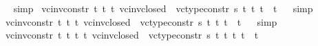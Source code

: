 \begin{isabellebody}
\isadelimproof
\ %
\endisadelimproof
%
\isatagproof
{}\isamarkupfalse%
\ simp%
\endisatagproof
{\isafoldproof}%
%
\isadelimproof
%
\endisadelimproof
\isanewline
{}\isamarkupfalse%
\ vc{\isacharunderscore}{\kern0pt}inv{\isacharunderscore}{\kern0pt}constr{\isacharunderscore}{\kern0pt}{}{}{\isacharcolon}{\kern0pt}{\isachardoublequoteopen}{\isasymforall}\ t{}\ t{}\ t{}{\isachardot}{\kern0pt}\ vc{\isacharunderscore}{\kern0pt}inv{\isacharunderscore}{\kern0pt}closed\ {}\ {\isacharparenleft}{\kern0pt}vc{\isacharunderscore}{\kern0pt}type{\isacharunderscore}{\kern0pt}constr{}\ s\ t{}\ t{}\ t{}{\isacharparenright}{\kern0pt}\ {\isacharequal}{\kern0pt}\ t{}{\isachardoublequoteclose}%
\isadelimproof
\ %
\endisadelimproof
%
\isatagproof
{}\isamarkupfalse%
\ simp%
\endisatagproof
{\isafoldproof}%
%
\isadelimproof
%
\endisadelimproof
\isanewline
{}\isamarkupfalse%
\ vc{\isacharunderscore}{\kern0pt}inv{\isacharunderscore}{\kern0pt}constr{\isacharunderscore}{\kern0pt}{}{}{\isacharcolon}{\kern0pt}{\isachardoublequoteopen}{\isasymforall}\ t{}\ t{}\ t{}{\isachardot}{\kern0pt}\ vc{\isacharunderscore}{\kern0pt}inv{\isacharunderscore}{\kern0pt}closed\ {}\ {\isacharparenleft}{\kern0pt}vc{\isacharunderscore}{\kern0pt}type{\isacharunderscore}{\kern0pt}constr{}\ s\ t{}\ t{}\ t{}{\isacharparenright}{\kern0pt}\ {\isacharequal}{\kern0pt}\ t{}{\isachardoublequoteclose}%
\isadelimproof
\ %
\endisadelimproof
%
\isatagproof
{}\isamarkupfalse%
\ simp%
\endisatagproof
{\isafoldproof}%
%
\isadelimproof
%
\endisadelimproof
\isanewline
{}\isamarkupfalse%
\ vc{\isacharunderscore}{\kern0pt}inv{\isacharunderscore}{\kern0pt}constr{\isacharunderscore}{\kern0pt}{}{}{\isacharcolon}{\kern0pt}{\isachardoublequoteopen}{\isasymforall}\ t{}\ t{}\ t{}\ t{}{\isachardot}{\kern0pt}\ vc{\isacharunderscore}{\kern0pt}inv{\isacharunderscore}{\kern0pt}closed\ {}\ {\isacharparenleft}{\kern0pt}vc{\isacharunderscore}{\kern0pt}type{\isacharunderscore}{\kern0pt}constr{}\ s\ t{}\ t{}\ t{}\ t{}{\isacharparenright}{\kern0pt}\ {\isacharequal}{\kern0pt}\ t{}{\isachardoublequoteclose}%
\isadelimproof
\ %
\endisadelimproof

\end{isabellebody}
